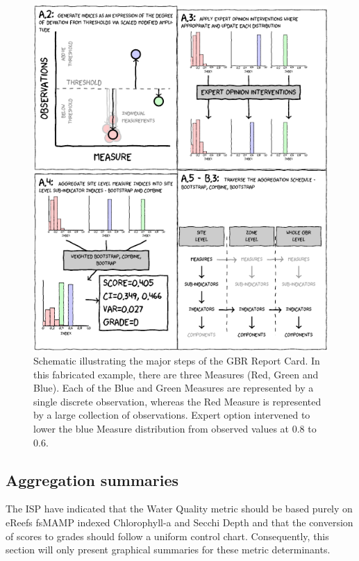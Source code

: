 \begin{figure}[h]
\includegraphics[width=\linewidth]{figures/Diagrams/schematic.pdf}
\caption{Schematic illustrating the major steps of the GBR Report Card. In this fabricated example,
there are three Measures (Red, Green and Blue).  Each of the Blue and Green Measures are represented by a single
discrete observation, whereas the Red Measure is represented by a large collection of observations.
Expert option intervened to lower the blue Measure distribution from observed values at 0.8 to 0.6.}\label{fig:schematic}
\end{figure}

\clearpage




\subsection{Aggregation summaries}

The ISP have indicated that the Water Quality metric should be based purely on eReefs fsMAMP indexed
Chlorophyll-a and Secchi Depth and that the conversion of scores to grades should follow a uniform
control chart.  Consequently, this section will only present graphical summaries for these metric
determinants.  %

